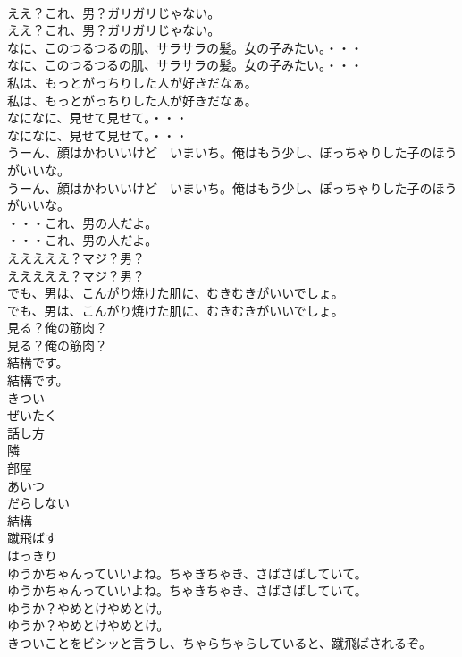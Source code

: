 \documentclass[8pt]{extreport}
\begin{document}
\begin{CJK}{UTF8}{min}
\\	ええ？これ、男？ガリガリじゃない。	
\\	ええ？これ、男？ガリガリじゃない。 
\\	なに、このつるつるの肌、サラサラの髪。女の子みたい。・・・	
\\	なに、このつるつるの肌、サラサラの髪。女の子みたい。・・・ 
\\	私は、もっとがっちりした人が好きだなぁ。	
\\	私は、もっとがっちりした人が好きだなぁ。 
\\	なになに、見せて見せて。・・・	
\\	なになに、見せて見せて。・・・ 
\\	うーん、顔はかわいいけど　いまいち。俺はもう少し、ぽっちゃりした子のほうがいいな。	
\\	うーん、顔はかわいいけど　いまいち。俺はもう少し、ぽっちゃりした子のほうがいいな。 
\\	・・・これ、男の人だよ。	
\\	・・・これ、男の人だよ。 
\\	えええええ？マジ？男？	
\\	えええええ？マジ？男？ 
\\	でも、男は、こんがり焼けた肌に、むきむきがいいでしょ。	
\\	でも、男は、こんがり焼けた肌に、むきむきがいいでしょ。 
\\	見る？俺の筋肉？	
\\	見る？俺の筋肉？ 
\\	結構です。	
\\	結構です。 
\\	きつい
\\	ぜいたく
\\	話し方
\\	隣
\\	部屋
\\	あいつ
\\	だらしない
\\	結構
\\	蹴飛ばす
\\	はっきり
\\	ゆうかちゃんっていいよね。ちゃきちゃき、さばさばしていて。	
\\	ゆうかちゃんっていいよね。ちゃきちゃき、さばさばしていて。 
\\	ゆうか？やめとけやめとけ。	
\\	ゆうか？やめとけやめとけ。 
\\	きついことをビシッと言うし、ちゃらちゃらしていると、蹴飛ばされるぞ。	

\end{CJK}
\end{document}
